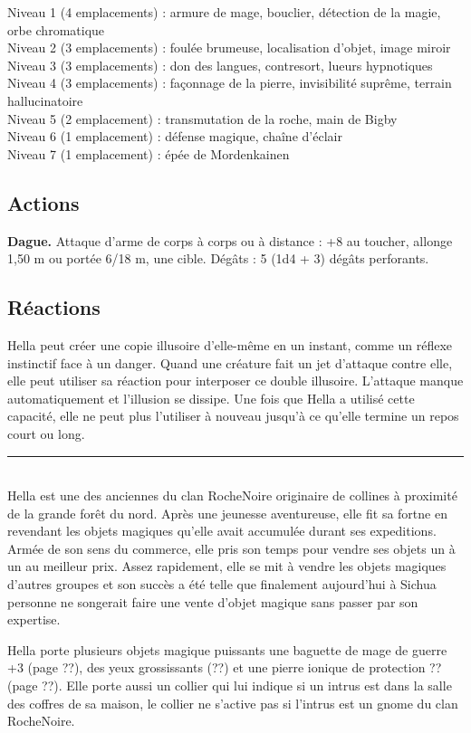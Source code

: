 \begin{figure*}[tb!]
{\begin{minipage}[c]{.45\linewidth}
Niveau 1 (4 emplacements) : armure de mage, bouclier, détection de la magie, orbe chromatique\\
Niveau 2 (3 emplacements) : foulée brumeuse, localisation d'objet, image miroir\\
Niveau 3 (3 emplacements) : don des langues, contresort, lueurs hypnotiques \\
Niveau 4 (3 emplacements) : façonnage de la pierre, invisibilité suprême, terrain hallucinatoire\\
Niveau 5 (2 emplacement) : transmutation de la roche, main de Bigby \\
Niveau 6 (1 emplacement) : défense magique, chaîne d'éclair \\
Niveau 7 (1 emplacement) : épée de Mordenkainen
 \end{minipage}
  \hspace{4pt}
 \begin{minipage}[c]{.45\linewidth}
 \vspace{-10pt}
    \subsection*{Actions}
    {\bfseries Dague.} Attaque d'arme de corps à corps ou à distance : +8 au toucher, allonge 1,50 m ou portée 6/18 m,
         une cible. Dégâts : 5 (1d4 + 3) dégâts perforants. 
    \subsection*{Réactions}
Hella peut créer une copie illusoire d'elle-même en un instant, comme un réflexe instinctif face à un danger. Quand une créature fait un jet d'attaque contre elle, elle peut utiliser sa réaction pour interposer ce double illusoire. L'attaque manque automatiquement et l'illusion se dissipe. Une fois que Hella a utilisé cette capacité, elle ne peut plus l'utiliser à nouveau jusqu'à ce qu'elle termine un repos court ou long. \\
   \noindent\rule{\textwidth}{1pt} \\
Hella est une des anciennes du clan RocheNoire originaire de collines à 
proximité de la grande forêt du nord. Après une jeunesse aventureuse, elle 
fit sa fortne en revendant les objets magiques qu'elle avait accumulée durant 
ses expeditions. Armée de son sens du commerce, elle pris son temps pour vendre
ses objets un à un au meilleur prix. Assez rapidement, elle se mit à vendre les
objets magiques d'autres groupes et son succès a été telle que finalement 
aujourd'hui à Sichua personne ne songerait faire une vente d'objet magique 
sans passer par son expertise.

Hella porte plusieurs objets magique puissants une baguette de mage de guerre +3 (page ??), des 
yeux grossissants (??) et une pierre ionique de protection ?? (page ??). Elle porte aussi un collier 
qui lui indique si un intrus est dans la salle des coffres de sa maison, le 
collier ne s'active pas si l'intrus est un gnome du clan RocheNoire.

\end{minipage}
}%
\end{figure*}

